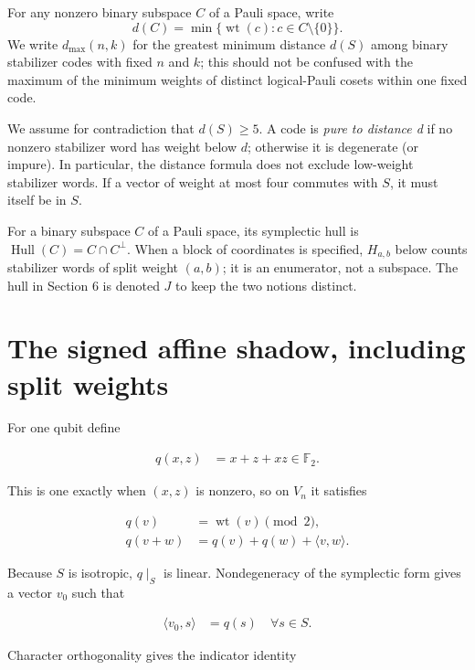 \documentclass[11pt]{article}
\begin{document}
For any nonzero binary subspace \(C\) of a Pauli space, write
\[
d(C)=\min\{\operatorname{wt}(c):c\in C\setminus\{0\}\}.
\]
We write \(d_{\max}(n,k)\) for the greatest minimum distance \(d(S)\) among binary stabilizer codes with fixed \(n\) and \(k\); this should not be confused with the maximum of the minimum weights of distinct logical-Pauli cosets within one fixed code.

We assume for contradiction that \(d(S) \ge 5\). A code is \emph{pure to distance d} if no nonzero stabilizer word has weight below \(d\); otherwise it is degenerate (or impure). In particular, the distance formula does not exclude low-weight stabilizer words. If a vector of weight at most four commutes with \(S\), it must itself be in \(S\).

For a binary subspace \(C\) of a Pauli space, its symplectic hull is \(\operatorname{Hull}(C)=C \cap C^\perp\). When a block of coordinates is specified, \(H_{a,b}\) below counts stabilizer words of split weight \((a,b)\); it is an enumerator, not a subspace. The hull in Section 6 is denoted \(J\) to keep the two notions distinct.

\section{The signed affine shadow, including split weights}\label{the-signed-affine-shadow-including-split-weights}

For one qubit define

\[
\begin{aligned}
q(x,z) &=x + z + xz \in \mathbb{F}_{2}.
\end{aligned}
\]

This is one exactly when \((x,z)\) is nonzero, so on \(V_{n}\) it satisfies

\[
\begin{aligned}
q(v) &=\operatorname{wt}(v) \pmod 2, \\
q(v+w) &=q(v) + q(w) + \langle v,w \rangle.
\end{aligned}
\]

Because \(S\) is isotropic, \(q\mid _{S}\) is linear. Nondegeneracy of the symplectic form gives a vector \(v_{0}\) such that

\[
\begin{aligned}
\langle v_{0},s \rangle &=q(s)\quad\forall s \in S.
\end{aligned}
\]

Character orthogonality gives the indicator identity
\end{document}
